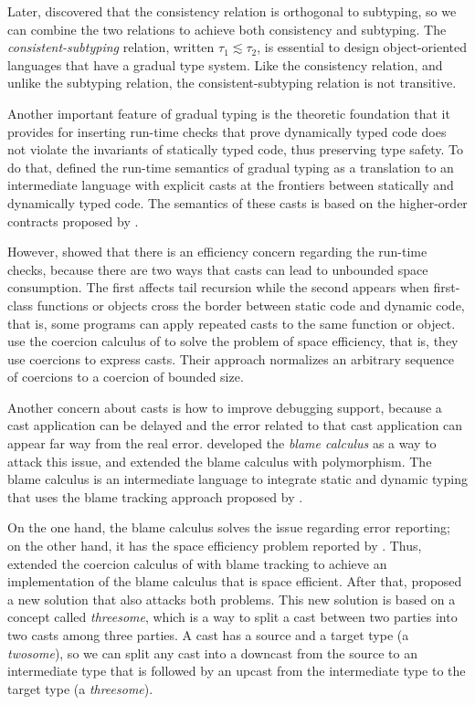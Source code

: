 \documentclass[preprint]{sig-alternate}
\begin{document}
Later, \citet{siek2007objects} discovered that the consistency relation
is orthogonal to subtyping, so we can combine the two relations to
achieve both consistency and subtyping.
The \textit{consistent-subtyping} relation,
written $\tau_{1} \lesssim \tau_{2}$,
is essential to design object-oriented languages that have a
gradual type system.
Like the consistency relation, and unlike the subtyping relation,
the consistent-subtyping relation is not transitive.

Another important feature of gradual typing is the theoretic
foundation that it provides for inserting run-time checks that
prove dynamically typed code does not violate the invariants of
statically typed code, thus preserving type safety.
To do that, \citet{siek2006gradual} defined the run-time semantics
of gradual typing as a translation to an intermediate language with
explicit casts at the frontiers between statically and dynamically
typed code.
The semantics of these casts is based on the higher-order contracts
proposed by \citet{findler2002chf}.

However, \citet{herman2007sgt} showed that there is an efficiency
concern regarding the run-time checks, because there are two
ways that casts can lead to unbounded space consumption.
The first affects tail recursion while the second appears when
first-class functions or objects cross the border between
static code and dynamic code, that is, some programs can apply
repeated casts to the same function or object.
\citet{herman2007sgt} use the coercion calculus of
\citet{henglein1994dts} to solve the problem of space efficiency,
that is, they use coercions to express casts.
Their approach normalizes an arbitrary sequence of coercions to a
coercion of bounded size.

Another concern about casts is how to improve debugging support,
because a cast application can be delayed and the error related
to that cast application can appear far way from the real error.
\citet{wadler2009wpc} developed the \textit{blame calculus} as a way
to attack this issue, and \citet{ahmed2011bfa} extended the
blame calculus with polymorphism.
The blame calculus is an intermediate language to integrate
static and dynamic typing that uses the blame tracking approach
proposed by \citet{findler2002chf}.

On the one hand, the blame calculus solves the issue regarding
error reporting;
on the other hand, it has the space efficiency problem reported
by \citet{herman2007sgt}.
Thus, \citet{siek2009casts} extended the coercion calculus of
\citet{herman2007sgt} with blame tracking to achieve an
implementation of the blame calculus that is space efficient.
After that, \citet{siek2010blame} proposed a new solution that also
attacks both problems.
This new solution is based on a concept called \textit{threesome},
which is a way to split a cast between two parties into two casts
among three parties.
A cast has a source and a target type (a \textit{twosome}),
so we can split any cast into a downcast from the source to an
intermediate type that is followed by an upcast from the intermediate
type to the target type (a \textit{threesome}).
\end{document}
